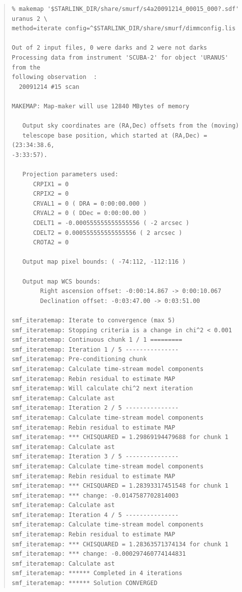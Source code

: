 \documentclass[twoside,11pt]{article}
\newenvironment{myquote}{\begin{quote}\begin{small}}{\end{small}\end{quote}}
\renewcommand{\_}{\texttt{\symbol{95}}}
\begin{document}
\begin{myquote}
\begin{verbatim}
% makemap '$STARLINK_DIR/share/smurf/s4a20091214_00015_000?.sdf' uranus 2 \
method=iterate config=^$STARLINK_DIR/share/smurf/dimmconfig.lis

Out of 2 input files, 0 were darks and 2 were not darks
Processing data from instrument 'SCUBA-2' for object 'URANUS' from the
following observation  :
  20091214 #15 scan

MAKEMAP: Map-maker will use 12840 MBytes of memory

   Output sky coordinates are (RA,Dec) offsets from the (moving)
   telescope base position, which started at (RA,Dec) = (23:34:38.6,
-3:33:57).

   Projection parameters used:
      CRPIX1 = 0
      CRPIX2 = 0
      CRVAL1 = 0 ( DRA = 0:00:00.000 )
      CRVAL2 = 0 ( DDec = 0:00:00.00 )
      CDELT1 = -0.000555555555555556 ( -2 arcsec )
      CDELT2 = 0.000555555555555556 ( 2 arcsec )
      CROTA2 = 0

   Output map pixel bounds: ( -74:112, -112:116 )

   Output map WCS bounds:
        Right ascension offset: -0:00:14.867 -> 0:00:10.067
        Declination offset: -0:03:47.00 -> 0:03:51.00

smf_iteratemap: Iterate to convergence (max 5)
smf_iteratemap: Stopping criteria is a change in chi^2 < 0.001
smf_iteratemap: Continuous chunk 1 / 1 =========
smf_iteratemap: Iteration 1 / 5 ---------------
smf_iteratemap: Pre-conditioning chunk
smf_iteratemap: Calculate time-stream model components
smf_iteratemap: Rebin residual to estimate MAP
smf_iteratemap: Will calculate chi^2 next iteration
smf_iteratemap: Calculate ast
smf_iteratemap: Iteration 2 / 5 ---------------
smf_iteratemap: Calculate time-stream model components
smf_iteratemap: Rebin residual to estimate MAP
smf_iteratemap: *** CHISQUARED = 1.29869194479688 for chunk 1
smf_iteratemap: Calculate ast
smf_iteratemap: Iteration 3 / 5 ---------------
smf_iteratemap: Calculate time-stream model components
smf_iteratemap: Rebin residual to estimate MAP
smf_iteratemap: *** CHISQUARED = 1.28393317451548 for chunk 1
smf_iteratemap: *** change: -0.0147587702814003
smf_iteratemap: Calculate ast
smf_iteratemap: Iteration 4 / 5 ---------------
smf_iteratemap: Calculate time-stream model components
smf_iteratemap: Rebin residual to estimate MAP
smf_iteratemap: *** CHISQUARED = 1.28363571374134 for chunk 1
smf_iteratemap: *** change: -0.000297460774144831
smf_iteratemap: Calculate ast
smf_iteratemap: ****** Completed in 4 iterations
smf_iteratemap: ****** Solution CONVERGED
\end{verbatim}
\end{myquote}
\end{document}
